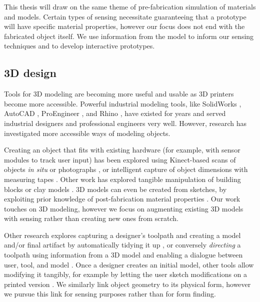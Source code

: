     This thesis will draw on the same theme of pre-fabrication simulation of materials and models. Certain types of sensing necessitate guaranteeing that a prototype will have specific material properties, however our focus does not end with the fabricated object itself. We use information from the model to inform our sensing techniques and to develop interactive prototypes.
    
\subsection{3D design}
    Tools for 3D modeling are becoming more useful and usable as 3D printers become more accessible. Powerful industrial modeling tools, like SolidWorks \cite{solidworks}, AutoCAD \cite{autocad}, ProEngineer \cite{proe}, and Rhino \cite{rhino}, have existed for years and served industrial designers and professional engineers very well. However, research has investigated more accessible ways of modeling objects.
    
    Creating an object that fits with existing hardware (for example, with sensor modules to track user input) has been explored using Kinect-based scans of objects \emph{in situ} \cite{molyneaux-kinectfusion, weichel-mixfab} or photographs \cite{lau-modeling}, or intelligent capture of object dimensions with measuring tapes \cite{lee-handscape,weichel-spata}. Other work has explored tangible manipulation of building blocks \cite{anderson-tangible, gupta-duplotrack} or clay models \cite{savage-mmarks}. 3D models can even be created from sketches, by exploiting prior knowledge of post-fabrication material properties \cite{mori-plushie, saul-sketchchair}. Our work touches on 3D modeling, however we focus on augmenting existing 3D models with sensing rather than creating new ones from scratch.
    
    Other research explores capturing a designer's toolpath and creating a model and/or final artifact by automatically tidying it up \cite{willis-interactive, mueller-constructable, mueller-laserorigami}, or conversely \emph{directing} a toolpath using information from a 3D model and enabling a dialogue between user, tool, and model \cite{zoran-freed}. Once a designer creates an initial model, other tools allow modifying it tangibly, for example by letting the user sketch modifications on a printed version \cite{song-modelcraft-tochi}. We similarly link object geometry to its physical form, however we pursue this link for sensing purposes rather than for form finding.
    
